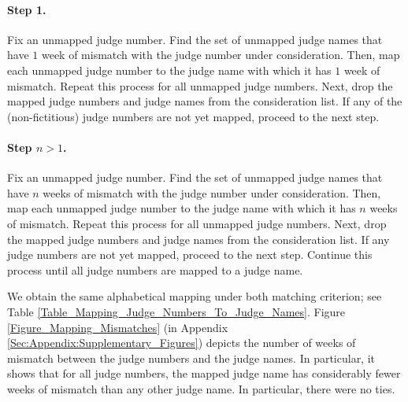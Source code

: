 \documentclass[11pt, oneside]{article}   	%
\theoremstyle{ModifiedStyle}
\begin{document}
  	\paragraph{Step 1.} Fix an unmapped judge number. Find the set of unmapped judge names that have $1$ week of mismatch with the judge number under consideration. Then, map each unmapped judge number to the judge name with which it has $1$ week of mismatch. Repeat this process for all unmapped judge numbers. Next, drop the mapped judge numbers and judge names from the consideration list. If any of the (non-fictitious) judge numbers are not yet mapped, proceed to the next step.
  	\vspace{-5mm}
  	\paragraph{Step $n>1$.} Fix an unmapped judge number. Find the set of unmapped judge names that have $n$ weeks of mismatch with the judge number under consideration. Then, map each unmapped judge number to the judge name with which it has $n$ weeks of mismatch. Repeat this process for all unmapped judge numbers. Next, drop the mapped judge numbers and judge names from the consideration list. If any judge numbers are not yet mapped, proceed to the next step. Continue this process until all judge numbers are mapped to a judge name.

  	We obtain the same alphabetical mapping under both matching criterion; see Table \ref{Table_Mapping_Judge_Numbers_To_Judge_Names}. Figure \ref{Figure_Mapping_Mismatches} (in Appendix \ref{Sec:Appendix:Supplementary_Figures}) depicts the number of weeks of mismatch between the judge numbers and the judge names. In particular, it shows that for all judge numbers, the mapped judge name has considerably fewer weeks of mismatch than any other judge name. In particular, there were no ties.
\end{document}
